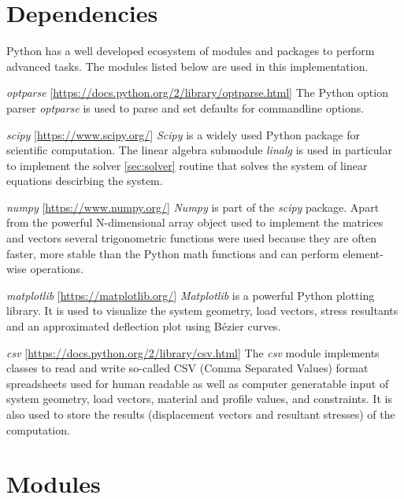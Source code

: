 \section{Dependencies}
\label{sec:depend}

Python has a well developed ecosystem of modules and packages to perform advanced tasks.
The modules listed below are used in this implementation.
\bigskip
 
\textit{optparse} [\url{https://docs.python.org/2/library/optparse.html}] \linebreak
The Python option parser \textit{optparse} is used to parse and set defaults for commandline options.
\bigskip

\textit{scipy} [\url{https://www.scipy.org/}]\linebreak
\textit{Scipy} is a widely used Python package for scientific computation. The linear algebra submodule \textit{linalg} is used in particular to implement the solver \ref{sec:solver} routine that solves the system of linear equations descirbing the system.
\bigskip

\textit{numpy} [\url{https://www.numpy.org/}]\linebreak
\textit{Numpy} is part of the \textit{scipy} package. Apart from the powerful N-dimensional array object used to implement the matrices and vectors several trigonometric functions were used because they are often faster, more stable than the Python math functions and can perform element-wise operations.
\bigskip

\textit{matplotlib} [\url{https://matplotlib.org/}]\linebreak
\textit{Matplotlib} is a powerful Python plotting library. It is used to visualize the system geometry, load vectors, stress resultants and an approximated deflection plot using B\'{e}zier curves.
\bigskip

\textit{csv} [\url{https://docs.python.org/2/library/csv.html}]\linebreak
The \textit{csv} module implements classes to read and write so-called CSV (Comma Separated Values) format spreadsheets used for human readable as well as computer generatable input of system geometry, load vectors, material and profile values, and constraints.
It is also used to store the results (displacement vectors and resultant stresses) of the computation.

\pagebreak

\section{Modules}
\label{sec:modules}


